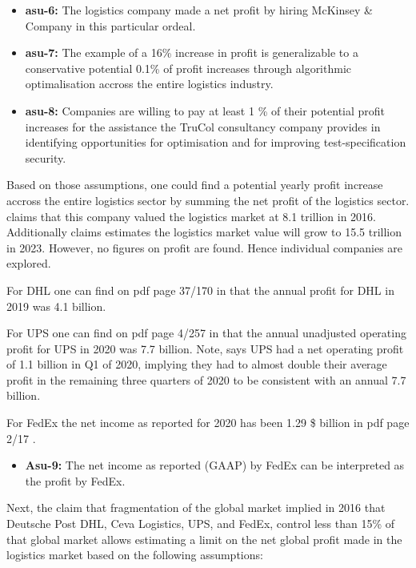  \begin{itemize}
 	\item \textbf{asu-6:} The logistics company made a net profit by hiring McKinsey \& Company in this particular ordeal.
	\item \textbf{asu-7:} The example of a 16\% increase in profit is generalizable to a conservative potential 0.1\% of profit increases through algorithmic optimalisation accross the entire logistics industry.
	\item \textbf{asu-8:} Companies are willing to pay at least 1 \% of their potential profit increases for the assistance the TruCol consultancy company provides in identifying opportunities for optimisation and for improving test-specification security.
\end{itemize}

Based on those assumptions, one could find a potential yearly profit increase accross the entire logistics sector by summing the net profit of the logistics sector. \cite{cips} claims that this company \cite{transparency_market_research} valued the logistics market at 8.1 trillion in 2016. Additionally \cite{cips} claims \cite{transparency_market_research} estimates the logistics market value will grow to 15.5 trillion in 2023. However, no figures on profit are found. Hence individual companies are explored. 

For DHL one can find on pdf page 37/170 in \cite{dhl_2019_annual_report} that the annual profit for DHL in 2019 was 4.1 billion.

For UPS one can find on pdf page 4/257 in \cite{ups_2020_annual_report} that the annual unadjusted operating profit for UPS in 2020 was 7.7 billion. Note, \cite{ups_q21_earnings_call} says UPS had a net operating profit of 1.1 billion in Q1 of 2020, implying they had to almost double their average profit in the remaining three quarters of 2020 to be consistent with an annual 7.7 billion.

For FedEx the net income as reported for 2020 has been 1.29 \$ billion in pdf page 2/17 \cite{fedex_2020_annual_report}. 

\begin{itemize}
\item \textbf{Asu-9:} The net income as reported (GAAP) by FedEx can be interpreted as the profit by FedEx.
\end{itemize}

Next, the claim that fragmentation of the global market implied in 2016 that Deutsche Post DHL, Ceva Logistics, UPS, and FedEx, control less than 15\% of that global market allows estimating a limit on the net global profit made in the logistics market based on the following assumptions:

